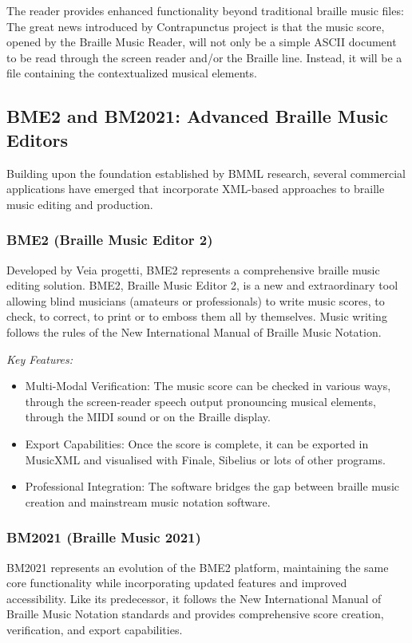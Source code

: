 The reader provides enhanced functionality beyond traditional braille music files: The great news introduced by Contrapunctus project is that the music score, opened by the Braille Music Reader, will not only be a simple ASCII document to be read through the screen reader and/or the Braille line. Instead, it will be a file containing the contextualized musical elements.

\subsection{BME2 and BM2021: Advanced Braille Music Editors}

Building upon the foundation established by BMML research, several commercial applications have emerged that incorporate XML-based approaches to braille music editing and production.

\subsubsection{BME2 (Braille Music Editor 2)}
Developed by Veia progetti, BME2 represents a comprehensive braille music editing solution. BME2, Braille Music Editor 2, is a new and extraordinary tool allowing blind musicians (amateurs or professionals) to write music scores, to check, to correct, to print or to emboss them all by themselves. Music writing follows the rules of the New International Manual of Braille Music Notation.

\emph{Key Features:}
\begin{itemize}
    \item Multi-Modal Verification: The music score can be checked in various ways, through the screen-reader speech output pronouncing musical elements, through the MIDI sound or on the Braille display.
    \item Export Capabilities: Once the score is complete, it can be exported in MusicXML and visualised with Finale, Sibelius or lots of other programs.
    \item Professional Integration: The software bridges the gap between braille music creation and mainstream music notation software.
\end{itemize}

\subsubsection{BM2021 (Braille Music 2021)}
BM2021 represents an evolution of the BME2 platform, maintaining the same core functionality while incorporating updated features and improved accessibility. Like its predecessor, it follows the New International Manual of Braille Music Notation standards and provides comprehensive score creation, verification, and export capabilities.

